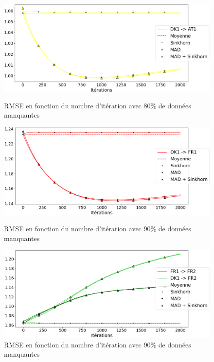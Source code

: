 \documentclass[acmsmall, natbib=false, nonacm]{acmart}
\begin{document}
\begin{figure}[H]
    \begin{minipage}[b]{0.4\linewidth}
		\centering \includegraphics[scale=0.14]{images/80_biais_AT1.png}
		\caption{RMSE en fonction du nombre d'itération avec 80\% de données manquantes}
	\end{minipage}\hfill
    \begin{minipage}[b]{0.4\linewidth}
		\centering \includegraphics[scale=0.14]{images/90_biais_FR1.png}
		\caption{RMSE en fonction du nombre d'itération avec 90\% de données manquantes}
	\end{minipage}\hfill
    \begin{minipage}[b]{0.4\linewidth}
		\centering \includegraphics[scale=0.14]{images/90_biais_FR2.png}
		\caption{RMSE en fonction du nombre d'itération avec 90\% de données manquantes}
	\end{minipage}
\end{figure}
\end{document}
